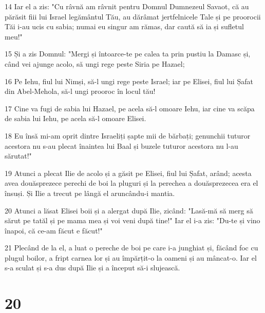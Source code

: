 \par 14 Iar el a zis: "Cu râvnă am râvnit pentru Domnul Dumnezeul Savaot, că au părăsit fiii lui Israel legământul Tău, au dărâmat jertfelnicele Tale și pe proorocii Tăi i-au ucis cu sabia; numai eu singur am rămas, dar caută să ia și sufletul meu!"
\par 15 Și a zis Domnul: "Mergi și întoarce-te pe calea ta prin pustiu la Damasc și, când vei ajunge acolo, să ungi rege peste Siria pe Hazael;
\par 16 Pe Iehu, fiul lui Nimși, să-l ungi rege peste Israel; iar pe Elisei, fiul lui Șafat din Abel-Mehola, să-l ungi prooroc în locul tău!
\par 17 Cine va fugi de sabia lui Hazael, pe acela să-l omoare Iehu, iar cine va scăpa de sabia lui Iehu, pe acela să-l omoare Elisei.
\par 18 Eu însă mi-am oprit dintre Israeliți șapte mii de bărbați; genunchii tuturor acestora nu s-au plecat înaintea lui Baal și buzele tuturor acestora nu l-au sărutat!"
\par 19 Atunci a plecat Ilie de acolo și a găsit pe Elisei, fiul lui Șafat, arând; acesta avea douăsprezece perechi de boi la pluguri și la perechea a douăsprezecea era el însuși. Și Ilie a trecut pe lângă el aruncându-i mantia.
\par 20 Atunci a lăsat Elisei boii și a alergat după Ilie, zicând: "Lasă-mă să merg să sărut pe tatăl și pe mama mea și voi veni după tine!" Iar el i-a zis: "Du-te și vino înapoi, că ce-am făcut e făcut!"
\par 21 Plecând de la el, a luat o pereche de boi pe care i-a junghiat și, făcând foc cu plugul boilor, a fript carnea lor și au împărțit-o la oameni și au mâncat-o. Iar el s-a sculat și s-a dus după Ilie și a început să-i slujească.

\chapter{20}

